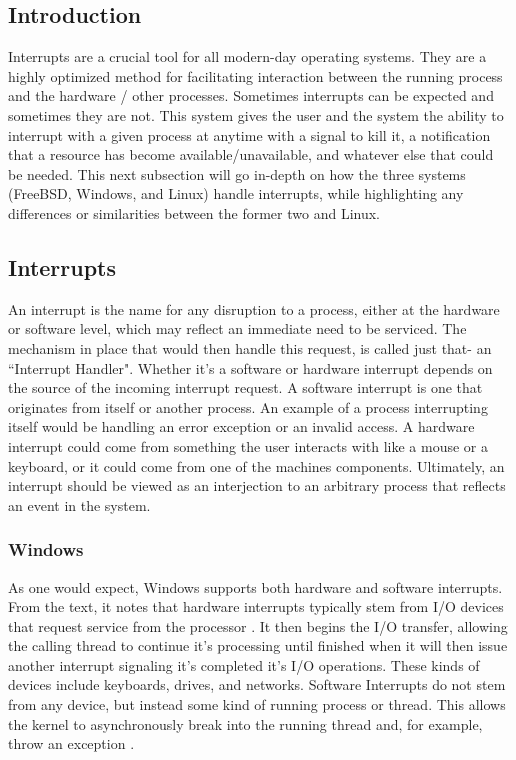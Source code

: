 

\subsection{Introduction}
\label{sec:Introduction}
\par Interrupts are a crucial tool for all modern-day operating systems.
They are a highly optimized method for facilitating interaction between the running process and the hardware / other processes.
Sometimes interrupts can be expected and sometimes they are not.
This system gives the user and the system the ability to interrupt with a given process at anytime with a signal to kill it, a notification that a resource has become available/unavailable, and whatever else that could be needed.
This next subsection will go in-depth on how the three systems (FreeBSD, Windows, and Linux) handle interrupts, while highlighting any differences or similarities between the former two and Linux.

\subsection{Interrupts}
\label{sec:Interrupts}
\par An interrupt is the name for any disruption to a process, either at the hardware or software level, which may reflect an immediate need to be serviced.
The mechanism in place that would then handle this request, is called just that- an ``Interrupt Handler".
Whether it's a software or hardware interrupt depends on the source of the incoming interrupt request.
A software interrupt is one that originates from itself or another process.
An example of a process interrupting itself would be handling an error exception or an invalid access.
A hardware interrupt could come from something the user interacts with like a mouse or a keyboard, or it could come from one of the machines components.
Ultimately, an interrupt should be viewed as an interjection to an arbitrary process that reflects an event in the system.

\subsubsection{Windows}
\label{sub:Interrupts Windows}
\par As one would expect, Windows supports both hardware and software interrupts.
From the text, it notes that hardware interrupts typically stem from I/O devices that request service from the processor \cite{win:1}.
It then begins the I/O transfer, allowing the calling thread to continue it's processing until finished when it will then issue another interrupt signaling it's completed it's I/O operations.
These kinds of devices include keyboards, drives, and networks.
Software Interrupts do not stem from any device, but instead some kind of running process or thread.
This allows the kernel to asynchronously break into the running thread and, for example, throw an exception \cite{win:1}.

